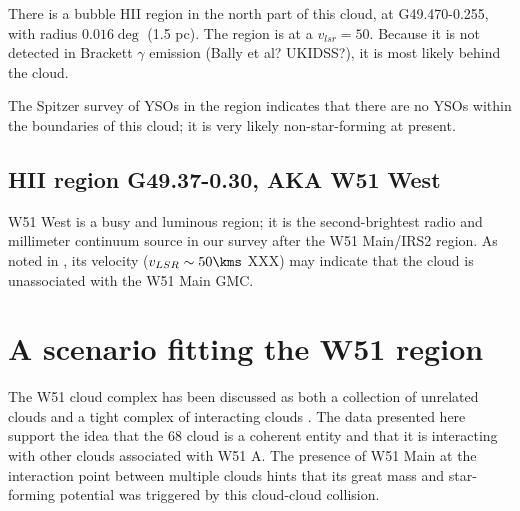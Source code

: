 There is a bubble HII region in the north part of this cloud, at G49.470-0.255,
with radius $0.016\deg$ (1.5 pc).  The \hii region is at a $v_{lsr}=50$\kms.
Because it is not detected in Brackett $\gamma$ emission (Bally et al?
UKIDSS?), it is most likely behind the cloud.

The \citet{Kang2009a} Spitzer survey of YSOs in the region indicates that there
are no YSOs within the boundaries of this cloud; it is very likely
non-star-forming at present.

\subsection{HII region G49.37-0.30, AKA W51 West}
W51 West is a busy and luminous \hii region; it is the second-brightest radio
and millimeter continuum source in our survey after the W51 Main/IRS2 region.
As noted in \citet{Carpenter1998a}, its velocity ($v_{LSR}\sim 50\kms$ XXX) 
may indicate that the cloud is unassociated with the W51 Main GMC.


\section{A scenario fitting the W51 region}
The W51 cloud complex has been discussed as both a collection of unrelated
clouds and a tight complex of interacting clouds \citep{Carpenter1998a,
Kang2010a}.  The \formaldehyde data presented here support the idea that the 68
\kms cloud is a coherent entity and that it is interacting with other clouds
associated with W51 A.  The presence of W51 Main at the interaction point
between multiple clouds hints that its great mass and star-forming potential
was triggered by this cloud-cloud collision.


